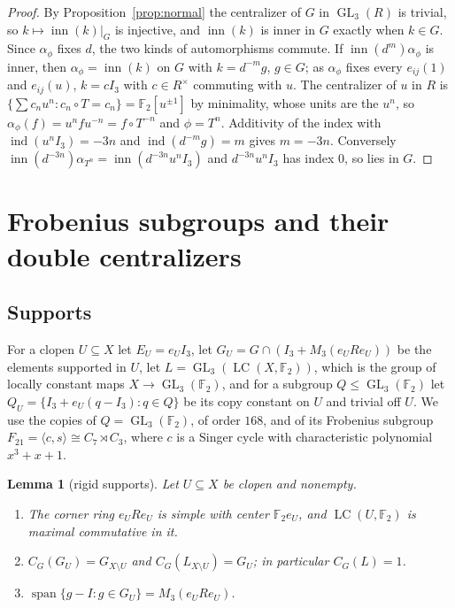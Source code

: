 \documentclass[11pt]{amsart}
\newtheorem{lemma}[theorem]{Lemma}
\theoremstyle{remark}
\newcommand{\F}{\mathbb F}
\newcommand{\LC}{\operatorname{LC}}
\newcommand{\GL}{\operatorname{GL}}
\newcommand{\ind}{\operatorname{ind}}
\newcommand{\inn}{\operatorname{inn}}
\begin{document}
\begin{proof}
By Proposition~\ref{prop:normal} the centralizer of $G$ in $\GL_3(R)$ is
trivial, so $k\mapsto\inn(k)|_G$ is injective, and $\inn(k)$ is inner in
$G$ exactly when $k\in G$. Since $\alpha_\phi$ fixes $d$, the two kinds of
automorphisms commute. If $\inn(d^m)\alpha_\phi$ is inner, then
$\alpha_\phi=\inn(k)$ on $G$ with $k=d^{-m}g$, $g\in G$; as $\alpha_\phi$
fixes every $e_{ij}(1)$ and $e_{ij}(u)$, $k=cI_3$ with $c\in R^\times$
commuting with $u$. The centralizer of $u$ in $R$ is
$\{\sum c_nu^n:c_n\circ T=c_n\}=\F_2[u^{\pm1}]$ by minimality, whose units
are the $u^n$, so $\alpha_\phi(f)=u^nfu^{-n}=f\circ T^{-n}$ and $\phi=T^n$.
Additivity of the index with $\ind(u^nI_3)=-3n$ and $\ind(d^{-m}g)=m$ gives
$m=-3n$. Conversely $\inn(d^{-3n})\alpha_{T^n}=\inn(d^{-3n}u^nI_3)$ and
$d^{-3n}u^nI_3$ has index $0$, so lies in $G$.
\end{proof}

\section{Frobenius subgroups and their double centralizers}\label{sec:frob}

\subsection*{Supports}
For a clopen $U\subseteq X$ let $E_U=e_UI_3$, let
$G_U=G\cap(I_3+M_3(e_URe_U))$ be the elements supported in $U$, let
$L=\GL_3(\LC(X,\F_2))$, which is the group of locally constant maps
$X\to\GL_3(\F_2)$, and for a subgroup $Q\le\GL_3(\F_2)$ let
$Q_U=\{I_3+e_U(q-I_3):q\in Q\}$ be its copy constant on $U$ and trivial
off $U$. We use the copies of $Q=\GL_3(\F_2)$, of order $168$, and of its
Frobenius subgroup $F_{21}=\langle c,s\rangle\cong C_7\rtimes C_3$, where
$c$ is a Singer cycle with characteristic polynomial $x^3+x+1$.

\begin{lemma}[rigid supports]\label{lem:supports}
Let $U\subseteq X$ be clopen and nonempty.
\begin{enumerate}
\item[\textup{(a)}] The corner ring $e_URe_U$ is simple with center
$\F_2e_U$, and $\LC(U,\F_2)$ is maximal commutative in it.
\item[\textup{(b)}] $C_G(G_U)=G_{X\setminus U}$ and $C_G(L_{X\setminus U})=G_U$;
in particular $C_G(L)=1$.
\item[\textup{(c)}] $\operatorname{span}\{g-I:g\in G_U\}=M_3(e_URe_U)$.
\end{enumerate}
\end{lemma}
\end{document}
